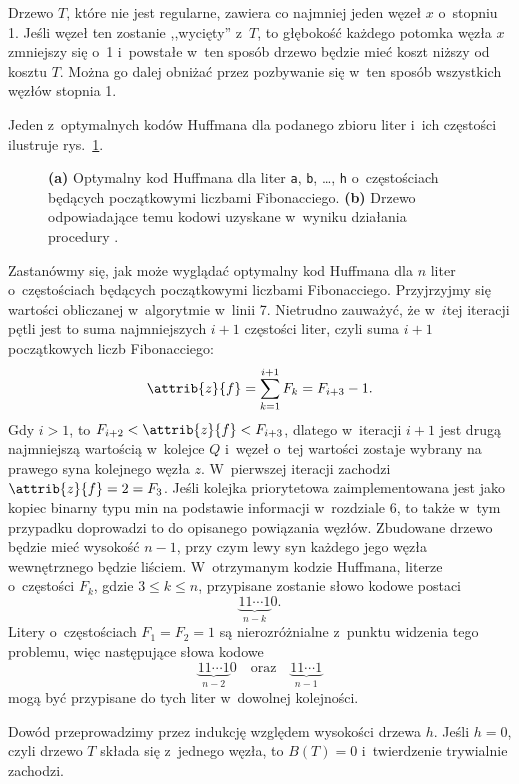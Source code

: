 
\exercise %
Drzewo $T$, które nie jest regularne, zawiera co najmniej jeden węzeł $x$ o~stopniu 1.
Jeśli węzeł ten zostanie ,,wycięty'' z~$T$, to głębokość każdego potomka węzła $x$ zmniejszy się o~1 i~powstałe w~ten sposób drzewo będzie mieć koszt niższy od kosztu $T$.
Można go dalej obniżać przez pozbywanie się w~ten sposób wszystkich węzłów stopnia 1.

\exercise %
Jeden z~optymalnych kodów Huffmana dla podanego zbioru liter i~ich częstości ilustruje rys.\ \ref{fig:16.3-2}.
\begin{figure}[!ht]
	\centering 
	\caption{{\sffamily\bfseries(a)} Optymalny kod Huffmana dla liter \texttt{a}, \texttt{b}, \dots, \texttt{h} o~częstościach będących początkowymi liczbami Fibonacciego.
{\sffamily\bfseries(b)} Drzewo odpowiadające temu kodowi uzyskane w~wyniku działania procedury .} \label{fig:16.3-2}
\end{figure}

Zastanówmy się, jak może wyglądać optymalny kod Huffmana dla $n$ liter o~częstościach będących początkowymi liczbami Fibonacciego.
Przyjrzyjmy się wartości  obliczanej w~algorytmie  w~linii 7.
Nietrudno zauważyć, że w~$i$\nbhyphen tej iteracji pętli  jest to suma najmniejszych $i+1$ częstości liter, czyli suma $i+1$ początkowych liczb Fibonacciego:
\[
	\attrib{z}{f} = \sum_{k=1}^{i+1}F_k = F_{i+3}-1.
\]
Gdy $i>1$, to $F_{i+2}<\attrib{z}{f}<F_{i+3}$, dlatego  w~iteracji $i+1$ jest drugą najmniejszą wartością w~kolejce $Q$ i~węzeł o~tej wartości zostaje wybrany na prawego syna kolejnego węzła $z$.
W~pierwszej iteracji zachodzi $\attrib{z}{f}=2=F_3$.
Jeśli kolejka priorytetowa zaimplementowana jest jako kopiec binarny typu min na podstawie informacji w~rozdziale 6, to także w~tym przypadku doprowadzi to do opisanego powiązania węzłów.
Zbudowane drzewo będzie mieć wysokość $n-1$, przy czym lewy syn każdego jego węzła wewnętrznego będzie liściem.
W~otrzymanym kodzie Huffmana, literze o~częstości $F_k$, gdzie $3\le k\le n$, przypisane zostanie słowo kodowe postaci
\[
	\underbrace{11\cdots1}_{n-k}0.
\]
Litery o~częstościach $F_1=F_2=1$ są nierozróżnialne z~punktu widzenia tego problemu, więc następujące słowa kodowe
\[
	\underbrace{11\cdots1}_{n-2}0 \quad\text{oraz}\quad \underbrace{11\cdots1}_{n-1}
\]
mogą być przypisane do tych liter w~dowolnej kolejności.

\exercise %
Dowód przeprowadzimy przez indukcję względem wysokości drzewa $h$.
Jeśli $h=0$, czyli drzewo $T$ składa się z~jednego węzła, to $B(T)=0$ i~twierdzenie trywialnie zachodzi.

